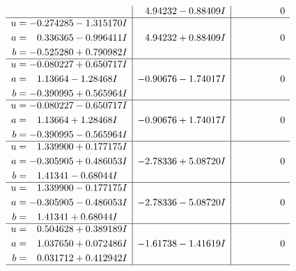 \documentclass[1p]{elsarticle_modified}
\theoremstyle{definition}
\begin{document}
$$\begin{array}{c|c|c}
 & \phantom{-}4.94232 - 0.88409 I & \phantom{-0.000000 } 0 \\ \hline\begin{aligned}
u &= -0.274285 - 1.315170 I \\
a &= \phantom{-}0.336365 - 0.996411 I \\
b &= -0.525280 + 0.790982 I\end{aligned}
 & \phantom{-}4.94232 + 0.88409 I & \phantom{-0.000000 } 0 \\ \hline\begin{aligned}
u &= -0.080227 + 0.650717 I \\
a &= \phantom{-}1.13664 - 1.28468 I \\
b &= -0.390995 + 0.565964 I\end{aligned}
 & -0.90676 - 1.74017 I & \phantom{-0.000000 } 0 \\ \hline\begin{aligned}
u &= -0.080227 - 0.650717 I \\
a &= \phantom{-}1.13664 + 1.28468 I \\
b &= -0.390995 - 0.565964 I\end{aligned}
 & -0.90676 + 1.74017 I & \phantom{-0.000000 } 0 \\ \hline\begin{aligned}
u &= \phantom{-}1.339900 + 0.177175 I \\
a &= -0.305905 + 0.486053 I \\
b &= \phantom{-}1.41341 - 0.68044 I\end{aligned}
 & -2.78336 + 5.08720 I & \phantom{-0.000000 } 0 \\ \hline\begin{aligned}
u &= \phantom{-}1.339900 - 0.177175 I \\
a &= -0.305905 - 0.486053 I \\
b &= \phantom{-}1.41341 + 0.68044 I\end{aligned}
 & -2.78336 - 5.08720 I & \phantom{-0.000000 } 0 \\ \hline\begin{aligned}
u &= \phantom{-}0.504628 + 0.389189 I \\
a &= \phantom{-}1.037650 + 0.072486 I \\
b &= \phantom{-}0.031712 + 0.412942 I\end{aligned}
 & -1.61738 - 1.41619 I & \phantom{-0.000000 } 0\\
 \hline 
 \end{array}$$\newpage$$\begin{array}{c|c|c}  

\end{array}$$
\end{document}
